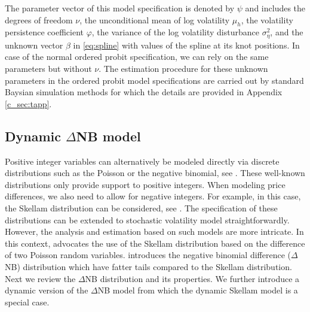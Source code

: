 \documentclass[12pt]{article}
\begin{document}
The parameter vector of this model specification is denoted by $\psi$ and
includes the degrees of freedom $\nu$, the unconditional mean of log volatility
$\mu _h$, the volatility persistence coefficient $\varphi$, the variance
of the log volatility disturbance $\sigma^{2}_{\eta}$, and the
unknown vector $\beta$ in \eqref{eq:spline} with values of the spline at its knot positions.
In case of the normal ordered probit specification, we can rely on the same
parameters but without $\nu$.
The estimation procedure for these unknown parameters in the
ordered probit model specifications are carried out by standard Baysian simulation
methods for which the details are provided in Appendix \ref{c_sec:tapp}.


\subsection{Dynamic $\Delta$NB model}

Positive integer variables can alternatively be modeled directly via discrete distributions such
as the Poisson or the negative binomial, see \cite{JohnsonKempKotz2005}.
These well-known distributions only provide support to positive integers.
When modeling price differences, we also need to allow for negative integers.
For example, in this case, the Skellam distribution can be considered,
see \cite{Skellam(46)}.
The specification of these distributions can be extended to
stochastic volatility model straightforwardly. However, the analysis and
estimation based on such models are more intricate.
In this context, \citet{AlzaidOmair2010}  advocates the use of the
Skellam distribution based on the difference of two Poisson random variables.
\citet{BNPollardShephard2012} introduces the negative binomial
difference ($\Delta$NB) distribution which have fatter tails
compared to the Skellam distribution. 
Next we review the $\Delta$NB distribution and its properties.
We further introduce a dynamic version of the $\Delta$NB model from which
the dynamic Skellam model is a special case.
\end{document}
